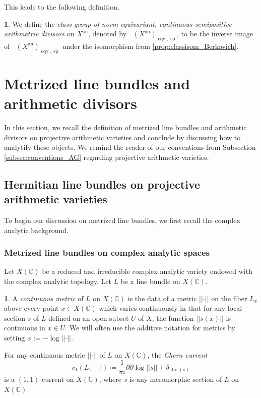 \documentclass[11pt,reqno]{amsart}
\newcommand{\mC}{\mathbb{C}}
\newcommand{\nrm}[1]{\left|\left |#1\right |\right |}
\theoremstyle{theorem}
\numberwithin{equation}{subsection}
\numberwithin{equation}{subsection}
\theoremstyle{definition}
\newtheorem{definition}[subsubsection]{\text{Definition}}
\theoremstyle{remark}
\numberwithin{equation}{subsubsection} \numberwithin{figure}{section}
\DeclareMathOperator{\an}{an}
\DeclareMathOperator{\aPic}{\widehat{Pic}}
\DeclareMathOperator{\ddiv}{div}
\DeclareMathOperator{\aCaCl}{\widehat{CaCl}}
\newcommand{\cdef}[1]{\textsf{\textit{#1}}}
\DeclareMathOperator{\semip}{sp}
\DeclareMathOperator{\eqv}{eqv}
\begin{document}
This leads to the following definition.

\begin{definition}\label{defn:classgroup_eqvsemip_Berk}
We define the \cdef{class group of norm-equivariant, continuous semipositive arithmetric divisors} on $X^{\an}$, denoted by $\aCaCl(X^{\an})_{\eqv, \semip}$, to be the inverse image of $\aPic(X^{\an})_{\eqv,\semip}$ under the isomorphism from \autoref{prop:classisom_Berkovich}. 
\end{definition}


\section{Metrized line bundles and arithmetic divisors}
\label{sec:metrizedprojectivearithmetic}
In this section, we recall the definition of metrized line bundles and arithmetic divisors on projective arithmetic varieties and conclude by discussing how to analytify these objects. 
We remind the reader of our conventions from Subsection \ref{subsec:conventions_AG} regarding projective arithmetic varieties. 

\subsection{Hermitian line bundles on projective arithmetic varieties}
To begin our discussion on metrized line bundles, we first recall the complex analytic background.

\subsubsection{Metrized line bundles on complex analytic spaces}
Let $X(\mC)$ be a reduced and irreducible complex analytic variety endowed with the complex analytic topology. Let $L$ be a line bundle on $X(\mC)$.

\begin{definition}
A \cdef{continuous metric} of $L$ on $X(\mC)$ is the data of a metric $\nrm{\cdot}$ on the fiber $L_x$ above every point $x\in X(\mC)$ which varies continuously in that for any local section $s$ of $L$ defined on an open subset $U$ of $X$, the function $\nrm{s(x)}$ is continuous in $x\in U$. We will often use the additive notation for metrics by setting $\phi := -\log \nrm{\cdot}$. 
\end{definition}

For any continuous metric $\nrm{\cdot}$ of $L$ on $X(\mC)$, the \cdef{Chern current} 
\[
c_1(L,\nrm{\cdot}) \coloneqq \frac{1}{\pi i}\partial \overline{\partial} \log\nrm{s} + \delta_{\ddiv(s)}
\]
is a $(1,1)$-current on $X(\mC)$, where $s$ is any meromorphic section of $L$ on $X(\mC)$.  
\end{document}

